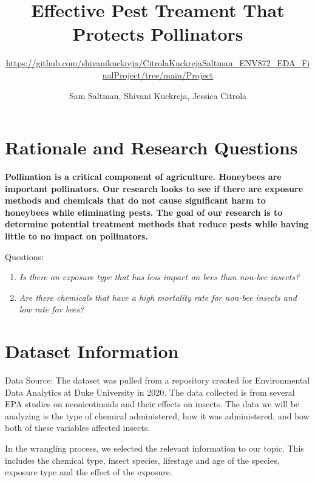 \documentclass[
  12pt,
]{article}
\title{Effective Pest Treament That Protects Pollinators}
\subtitle{\url{https://github.com/shivanikuckreja/CitrolaKuckrejaSaltman_ENV872_EDA_FinalProject/tree/main/Project}}
\author{Sam Saltman, Shivani Kuckreja, Jessica Citrola}
\date{}
\begin{document}
\maketitle

\newpage
\tableofcontents 
\newpage
\listoftables 
\newpage
\listoffigures 
\newpage

\hypertarget{rationale-and-research-questions}{%
\section{Rationale and Research
Questions}\label{rationale-and-research-questions}}

\textbf{Pollination is a critical component of agriculture. Honeybees
are important pollinators. Our research looks to see if there are
exposure methods and chemicals that do not cause significant harm to
honeybees while eliminating pests. The goal of our research is to
determine potential treatment methods that reduce pests while having
little to no impact on pollinators.}

Questions:

\begin{enumerate}
\def\labelenumi{\arabic{enumi}.}
\item
  \emph{Is there an exposure type that has less impact on bees than
  non-bee insects?}
\item
  \emph{Are there chemicals that have a high mortality rate for non-bee
  insects and low rate for bees?}
\end{enumerate}

\newpage

\hypertarget{dataset-information}{%
\section{Dataset Information}\label{dataset-information}}

Data Source: The dataset was pulled from a repository created for
Environmental Data Analytics at Duke University in 2020. The data
collected is from several EPA studies on neonicotinoids and their
effects on insects. The data we will be analyzing is the type of
chemical administered, how it was administered, and how both of these
variables affected insects.

In the wrangling process, we selected the relevant information to our
topic. This includes the chemical type, insect species, lifestage and
age of the species, exposure type and the effect of the exposure.
\end{document}
